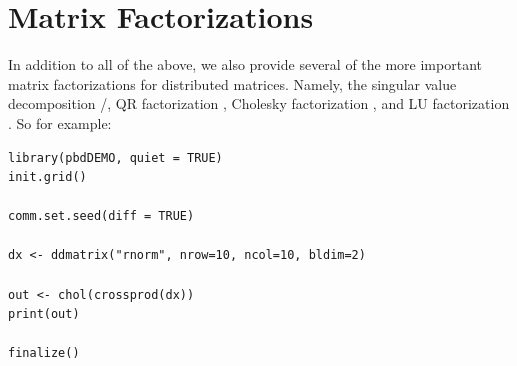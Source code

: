 \section{Matrix Factorizations}

In addition to all of the above, we also provide several of the more important matrix factorizations for distributed matrices.  Namely, the singular value decomposition /, QR factorization , Cholesky factorization , and LU factorization .  So for example:

\begin{lstlisting}[language=rr,title=Matrix Factorizations]
library(pbdDEMO, quiet = TRUE)
init.grid()

comm.set.seed(diff = TRUE)

dx <- ddmatrix("rnorm", nrow=10, ncol=10, bldim=2)

out <- chol(crossprod(dx))
print(out)

finalize()
\end{lstlisting}

